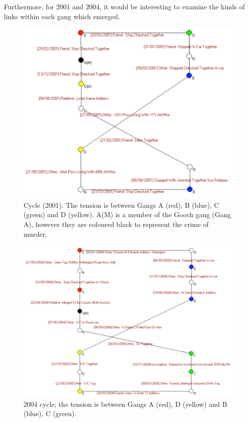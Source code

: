 \documentclass[twocolumn]{svjour3}          %
\theoremstyle{definition}
\begin{document}
Furthermore, for 2001 and 2004, it would be interesting to examine the
kinds of links within each gang which emerged.

\begin{figure}[!ht] 
\centering
\includegraphics[width=\columnwidth]{images/chain2001}
\caption{Cycle (2001). The tension is between Gangs A (red), B (blue),
 C (green) and D (yellow). A(M) is a member of the Gooch gang (Gang A), however they are coloured black to represent the crime of murder.}
\label{fig:chain2001}
\end{figure}


\begin{figure}[!ht] 
\centering
\includegraphics[width=\columnwidth]{images/chain2004}
\caption{2004 cycle; the tension is between Gangs A (red), D (yellow) and B (blue), C (green).}
\label{fig:chain2004}
\end{figure}
\end{document}
